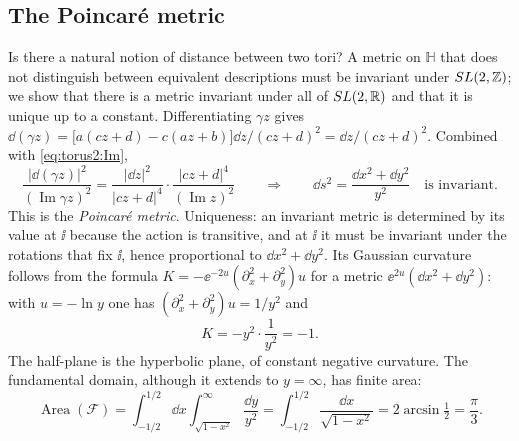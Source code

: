 \subsection{The Poincar\'e metric}

Is there a natural notion of distance between two tori? A metric on $\mathbb H$ that does
not distinguish between equivalent descriptions must be invariant under $SL(2,\mathbb{Z})$; we show that
there is a metric invariant under all of $SL(2,\mathbb{R})$ and that it is unique up to a constant.
Differentiating $\gamma z$ gives
$\dd(\gamma z)=\big[a(cz+d)-c(az+b)\big]\dd z/(cz+d)^2=\dd z/(cz+d)^2$. Combined with
\eqref{eq:torus2:Im},
\begin{equation}\label{eq:torus2:poincare}
 \frac{|\dd(\gamma z)|^2}{(\operatorname{Im}\gamma z)^2}
 =\frac{|\dd z|^2}{|cz+d|^4}\cdot\frac{|cz+d|^4}{(\operatorname{Im}z)^2}
 \qquad\Longrightarrow\qquad
 \dd s^2=\frac{\dd x^2+\dd y^2}{y^2}\quad\text{is invariant.}
\end{equation}
This is the \emph{Poincar\'e metric}. Uniqueness: an invariant
metric is determined by its value at $\ii$ because the action is transitive, and at $\ii$ it
must be invariant under the rotations that fix $\ii$, hence proportional to
$\dd x^2+\dd y^2$. Its Gaussian curvature follows from the formula
$K=-\ee^{-2u}(\partial_x^2+\partial_y^2)u$ for a metric $\ee^{2u}(\dd x^2+\dd y^2)$: with
$u=-\ln y$ one has $(\partial_x^2+\partial_y^2)u=1/y^2$ and
\begin{equation}\label{eq:torus2:K}
 K=-y^2\cdot\frac1{y^2}=-1 .
\end{equation}
The half-plane is the hyperbolic plane, of constant negative
curvature. The fundamental domain, although it extends to $y=\infty$, has finite area:
\begin{equation}\label{eq:torus2:area}
 \operatorname{Area}(\mathcal F)=\int_{-1/2}^{1/2}\!\dd x\int_{\sqrt{1-x^2}}^{\infty}\frac{\dd y}{y^2}
 =\int_{-1/2}^{1/2}\frac{\dd x}{\sqrt{1-x^2}}=2\arcsin\tfrac12=\frac\pi3 .
\end{equation}

